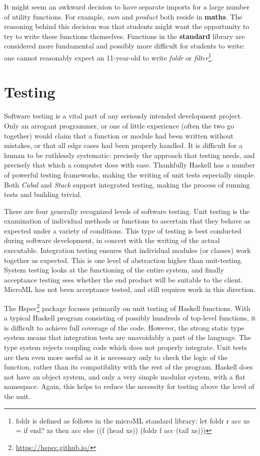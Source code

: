 \documentclass[12pt, a4paper]{report}
\begin{document}
It might seem an awkward decision to have separate imports for a large number of utility functions.
For example, \textit{sum} and \textit{product} both reside in \textbf{maths}. The reasoning
behind this decision was that students might want the opportunity to try to write these functions
themselves. Functions in the \textbf{standard} library are considered more fundamental and possibly
more difficult for students to write: one cannot reasonably expect an 11-year-old to write
\textit{foldr} or \textit{filter}\footnote{foldr is defined as follows in the microML standard
library\@: let foldr r acc xs = if end? xs then acc else ((f (head
xs)) (foldr f acc (tail xs)))}.


\chapter{Testing}
\label{testing}
Software testing is a vital part of any seriously intended development project. Only an arrogant
programmer, or one of little experience (often the two go together) would claim that a function or
module had been written without mistakes, or that all edge cases had been properly handled. It is
difficult for a human to be ruthlessly systematic: precisely the approach that testing needs, and
precisely that which a computer does with ease. Thankfully Haskell has a number of powerful testing
frameworks, making the writing of unit tests especially simple. Both \textit{Cabal} and
\textit{Stack} support integrated testing, making the process of running tests and building trivial.

There are four generally recognized levels of software testing. Unit testing is the examination of
individual methods or functions to ascertain that they behave as expected under a variety of
conditions. This type of testing is best conducted during software development, in concert with the
writing of the actual executable. Integration testing ensures that individual modules (or
classes) work together as expected. This is one level of abstraction higher than unit-testing.
System testing looks at the functioning of the entire system, and finally acceptance testing sees
whether the end product will be suitable to the client. MicroML has not been acceptance tested, and
still requires work in this direction.

The Hspec\footnote{\url{https://hspec.github.io/}} package focuses primarily on unit testing of
Haskell functions. With a typical Haskell program consisting of possibly hundreds of top-level
functions, it is difficult to achieve full coverage of the code. However, the strong static type
system means that integration tests are unavoidably a part of the language. The type system rejects
coupling code which does not properly integrate. Unit tests are then even more useful as it is
necessary only to check the logic of the function, rather than its compatibility with the rest of
the program. Haskell does not have an object system, and only a very simple modular system, with a
flat namespace. Again, this helps to reduce the necessity for testing above the level of the unit.
\end{document}
